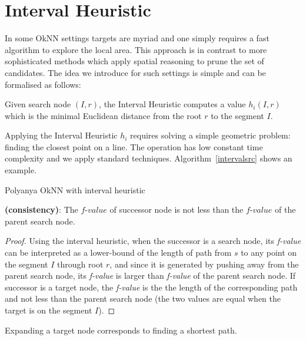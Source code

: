 \section{Interval Heuristic}\label{intervalh}
In some OkNN settings targets are myriad and one simply requires a fast algorithm to explore
the local area. This approach is in contrast to more sophisticated methods which apply spatial
reasoning to prune the set of candidates. The idea we introduce for such settings is simple and
can be formalised as follows:

\begin{definition}
  Given search node $(I, r)$, the Interval Heuristic computes a value $h_i(I, r)$ which
  is the minimal Euclidean distance from the root $r$ to the segment $I$.
\end{definition}

Applying the Interval Heuristic $h_i$ requires solving a simple geometric problem: finding the
closest point on a line. The operation has low constant time complexity and we apply
standard techniques. Algorithm~\ref{intervalsrc} shows an example.

\begin{algorithm}[!htb]
  
  \caption{Polyanya OkNN with interval heuristic}
  \label{intervalsrc}
\end{algorithm}

\begin{theorem}{\textbf{(consistency)}:}\label{nodesc}
  The $\textit{f-value}$ of successor node is not less than the $\textit{f-value}$ of the parent
  search node.
\end{theorem}

\begin{proof}
  Using the interval heuristic, when the successor is a search node, its \textit{f-value}
  can be interpreted as a lower-bound of the length of path from
  $s$ to any point on the segment $I$ through root $r$, and since it is generated by pushing
  away from the parent search node, its \textit{f-value} is larger than \textit{f-value}
  of the parent search node. If successor is a target node, the \textit{f-value} is the the length
  of the corresponding path and not less than the parent search node (the two values are equal 
  when the target is on the segment $I$).%
\end{proof}

\begin{corollary}
  Expanding a target node corresponds to finding a shortest path.
\end{corollary}

